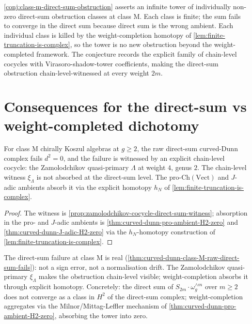 \begin{remark}
\label{rem:conjecture-scope}
\autoref{conj:class-m-direct-sum-obstruction} asserts an
infinite tower of individually non-zero direct-sum obstruction
classes at class \(\mathrm{M}\). Each class is finite; the sum
fails to converge in the direct sum because direct sum is the
wrong ambient. Each individual class is killed by the
weight-completion homotopy of
\autoref{lem:finite-truncation-is-complex}, so the tower is no
new obstruction beyond the weight-completed framework. The
conjecture records the explicit family of chain-level cocycles
with Virasoro-shadow-tower coefficients, making the direct-sum
obstruction chain-level-witnessed at every weight \(2m\).
\end{remark}

\section{Consequences for the direct-sum vs weight-completed
dichotomy}
\label{sec:consequences-dichotomy}

\begin{corollary}
\label{cor:class-m-direct-sum-is-wrong-ambient-strong}
\ClaimStatusProvedHere
For class \(\mathrm{M}\) chirally Koszul algebras at \(g \ge 2\),
the raw direct-sum curved-Dunn complex fails \(d^{2} = 0\), and
the failure is witnessed by an explicit chain-level cocycle: the
Zamolodchikov quasi-primary \(\Lambda\) at weight \(4\), genus
\(2\). The chain-level witness \(\xi_{\Lambda}\) is not absorbed
at the direct-sum level. The
pro-\(\mathrm{Ch}(\mathrm{Vect})\) and \(J\)-adic ambients
absorb it via the explicit homotopy \(h_{N}\) of
\autoref{lem:finite-truncation-is-complex}.
\end{corollary}

\begin{proof}
The witness is
\autoref{prop:zamolodchikov-cocycle-direct-sum-witness};
absorption in the pro- and \(J\)-adic ambients is
\autoref{thm:curved-dunn-pro-ambient-H2-zero} and
\autoref{thm:curved-dunn-J-adic-H2-zero} via the
\(h_{N}\)-homotopy construction of
\autoref{lem:finite-truncation-is-complex}.
\end{proof}

\begin{remark}[Summary]
\label{rem:first-principles-summary-direct-sum}
The direct-sum failure at class \(\mathrm{M}\) is real
(\autoref{thm:curved-dunn-class-M-raw-direct-sum-fails}): not a
sign error, not a normalisation drift. The Zamolodchikov
quasi-primary \(\xi_{\Lambda}\) makes the obstruction
chain-level visible; weight-completion absorbs it through
explicit homotopy. Concretely: the direct sum of
\(S_{2m} \cdot \omega_{g}^{\wedge m}\) over \(m \ge 2\) does not
converge as a class in \(H^{2}\) of the direct-sum complex;
weight-completion aggregates via the Milnor/Mittag-Leffler
mechanism of \autoref{thm:curved-dunn-pro-ambient-H2-zero},
absorbing the tower into zero.
\end{remark}
